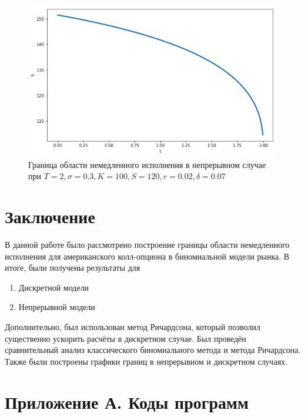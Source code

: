 \documentclass[oneside,final,12pt]{article}
\begin{document}
\begin{figure}[h]
\centering
\includegraphics[scale=0.6]{Continuous.png}
\caption{Граница области немедленного исполнения в непрерывном случае при \newline $T=2, \sigma=0.3, K=100, S=120, r=0.02, \delta=0.07$}
\label{continuous}
\end{figure} 

\section{Заключение}

В данной работе было рассмотрено построение границы области немедленного исполнения для американского колл-опциона в биномиальной модели рынка. В итоге, были получены результаты для
\begin{enumerate}
    \item Дискретной модели
    \item Непрерывной модели
\end{enumerate}

Дополнительно, был использован метод Ричардсона, который позволил существенно ускорить расчёты в дискретном случае. Был проведён сравнительный анализ классического биномиального метода и метода Ричардсона. Также были построены графики границ в непрерывном и дискретном случаях.

\newpage
{}
\section*{Приложение А. Коды программ}

\end{document}
